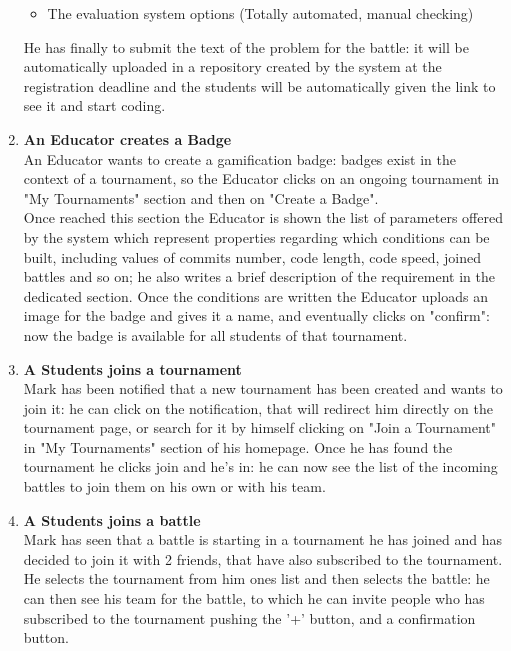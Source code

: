 \documentclass{article}
\begin{document}
\begin{enumerate}
\begin{itemize}
    \item The evaluation system options (Totally automated, manual checking)
  \end{itemize}
  He has finally to submit the text of the problem for the battle: it will be automatically uploaded in a repository created by the system at the registration
  deadline and the students will be automatically given the link to see it and start coding.\\
  \newpage
  \item \textbf{An Educator creates a Badge\\}An Educator wants to create a gamification badge: badges exist in the context of a tournament, so the Educator clicks on an ongoing tournament
  in "My Tournaments" section and then on "Create a Badge".\\
  Once reached this section the Educator is shown the list of parameters offered by the system which represent properties regarding which conditions can be built, including values of commits number, code length, code speed, joined battles
  and so on; he also writes a brief description of the requirement in the dedicated section.
  Once the conditions are written the Educator uploads an image for the badge and gives it a name, and eventually clicks on "confirm": now the badge is available for all students of that tournament.\\
  \item \textbf{A Students joins a tournament\\} Mark has been notified that a new tournament has been created and wants to join it: he can click on the notification, that will redirect him directly on the tournament page, or search for it by himself clicking on "Join a Tournament" in "My Tournaments"
  section of his homepage. 
  Once he has found the tournament he clicks join and he's in: he can now see the list of the incoming battles to join them on his own or with his team.\\
  \item \textbf{A Students joins a battle\\} Mark has seen that a battle is starting in a tournament he has joined and has decided to join it with 2 friends, that have also subscribed to the tournament.\\
  He selects the tournament from him ones list and then selects the battle: he can then see his team for the battle, to which he can invite people who has subscribed to the tournament pushing the '+' button, and a confirmation button.\\

\end{enumerate}
\end{document}
